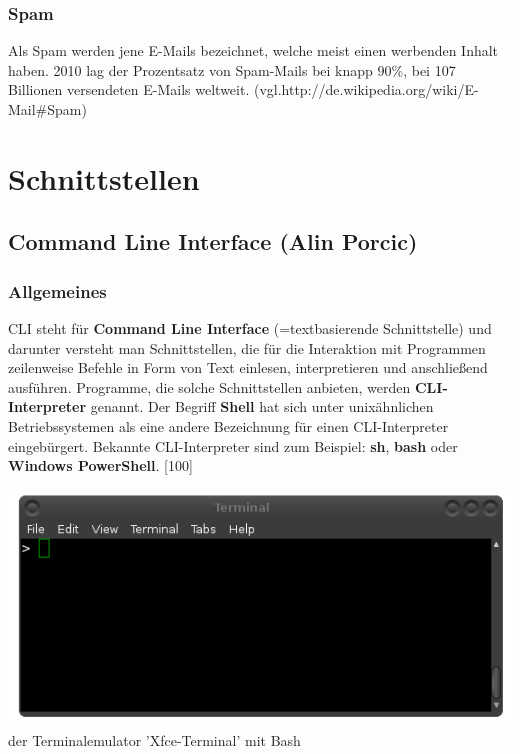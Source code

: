 \documentclass[12pt,a4paper]{report}
\begin{document}
\begin{onehalfspace}
\subsection{Spam}\label{sssec:Spam}
Als Spam werden jene E-Mails bezeichnet, welche meist einen werbenden Inhalt haben. 2010 lag der Prozentsatz von Spam-Mails bei knapp 90\%, bei 107 Billionen versendeten E-Mails weltweit.  (vgl.http://de.wikipedia.org/wiki/E-Mail\#Spam) 
\chapter{Schnittstellen}

\section{Command Line Interface (Alin Porcic)}
\subsection{Allgemeines}

CLI steht für \textbf{Command Line Interface} (=textbasierende Schnittstelle) und darunter versteht man Schnittstellen, die für die Interaktion mit Programmen zeilenweise Befehle in Form von Text einlesen, interpretieren und anschließend ausführen. Programme, die solche Schnittstellen anbieten, werden \textbf{CLI-Interpreter} genannt. Der Begriff \textbf{Shell} hat sich unter unixähnlichen Betriebssystemen als eine andere Bezeichnung für einen CLI-Interpreter eingebürgert. Bekannte CLI-Interpreter sind zum Beispiel: \textbf{sh}, \textbf{bash} oder \textbf{Windows PowerShell}. [100]

\begin{center}
\includegraphics[scale=0.5]{img/cli_pic.png}\\
der Terminalemulator 'Xfce-Terminal' mit Bash
\end{center}


\end{onehalfspace}
\end{document}
